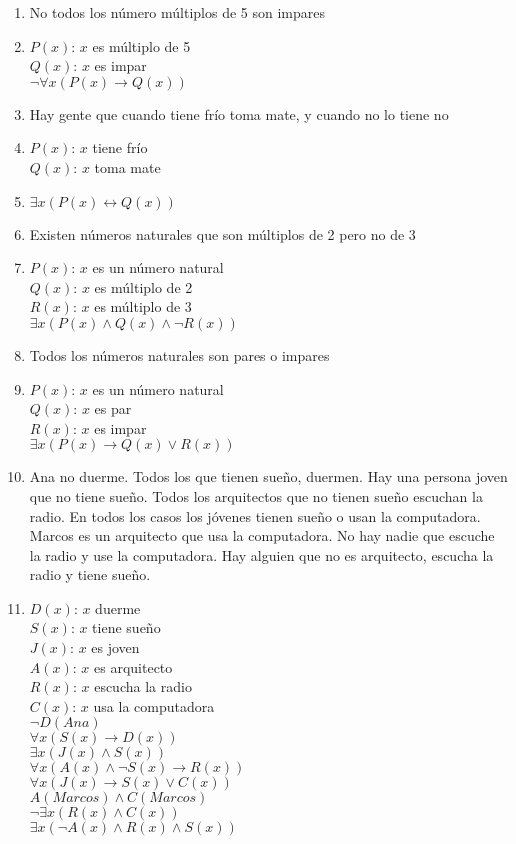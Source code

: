 \documentclass[a4paper]{article}
\newcommand{\answer}{\item[**]}
\newcommand{\then}{\to}
\newcommand{\eq}{\leftrightarrow}
\begin{document}
\begin{enumerate}
\begin{enumerate} [label=(\alph*)]
		\item No todos los número múltiplos de 5 son impares
		\answer $P(x)$: $x$ es múltiplo de 5 \\ $Q(x)$: $x$ es impar \\ $\neg \forall x ( P(x) \then  Q(x) )$

		\item Hay gente que cuando tiene frío toma mate, y cuando no lo tiene no
		\answer $P(x)$: $x$ tiene frío  \\ $Q(x)$: $x$ toma mate \\ \answer $\exists x ( P(x) \eq  Q(x) )$

		\item Existen números naturales que son múltiplos de 2 pero no de 3
		\answer $P(x)$: $x$ es un número natural  \\ $Q(x)$: $x$ es múltiplo de 2 \\ $R(x)$: $x$ es múltiplo de 3 \\ $\exists x ( P(x) \land  Q(x) \land  \neg R(x) )$

		\item Todos los números naturales son pares o impares
		\answer $P(x)$: $x$ es un número natural \\ $Q(x)$: $x$ es par \\ $R(x)$: $x$ es impar \\ $\exists x ( P(x) \then  Q(x) \lor  R(x) )$

		\item Ana no duerme. Todos los que tienen sueño, duermen. Hay una persona joven que no tiene sueño. Todos los 	arquitectos que no tienen sueño escuchan la radio. En todos los casos los jóvenes tienen sueño o usan la computadora. Marcos es un arquitecto que usa la computadora. No hay nadie que escuche la radio y use la computadora. Hay alguien que no es arquitecto, escucha la radio y tiene sueño.
		\answer $D(x)$: $x$ duerme \\ $S(x)$: $x$ tiene sueño \\ $J(x)$: $x$ es joven \\ $A(x)$: $x$ es arquitecto \\ $R(x)$: $x$ escucha la radio \\ $C(x)$: $x$ usa la computadora \\ $\neg D(Ana)$ \\ $\forall x ( S(x) \then  D(x) )$ \\ $\exists x ( J(x) \land  S(x) )$ \\ $\forall x ( A(x) \land  \neg S(x) \then  R(x) )$ \\ $\forall x ( J(x) \then  S(x) \lor  C(x) )$ \\ $A(Marcos) \land  C(Marcos)$ \\ $\neg \exists x ( R(x) \land  C(x) )$ \\ $\exists x (\neg A(x) \land  R(x) \land  S(x) )$


\end{enumerate}
\end{enumerate}
\end{document}
